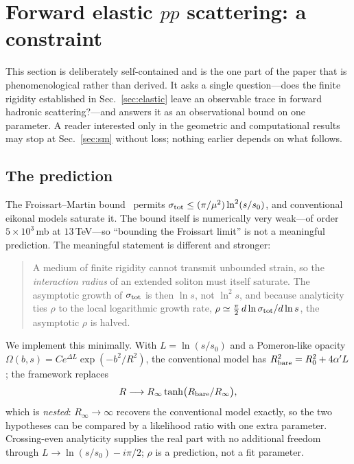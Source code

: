 \documentclass[aps,prd,preprint,nofootinbib,longbibliography]{revtex4-2}
\begin{document}
\section{Forward elastic $pp$ scattering: a constraint}
\label{sec:scattering}

This section is deliberately self-contained and is the one part of the paper that
is phenomenological rather than derived. It asks a single question---does the
finite rigidity established in Sec.~\ref{sec:elastic} leave an observable trace
in forward hadronic scattering?---and answers it as an observational bound on one
parameter. A reader interested only in the geometric and computational results
may stop at Sec.~\ref{sec:sm} without loss; nothing earlier depends on what
follows.

\subsection{The prediction}

The Froissart--Martin bound~\cite{froissart1961,martin1963} permits
$\sigma_{\rm tot}\le(\pi/\mu^2)\ln^2(s/s_0)$, and conventional eikonal models
saturate it. The bound itself is numerically very weak---of order
$5\times10^3\,$mb at $13\,$TeV---so ``bounding the Froissart limit'' is not a
meaningful prediction. The meaningful statement is different and stronger:

\begin{quote}
A medium of finite rigidity cannot transmit unbounded strain, so the
\emph{interaction radius} of an extended soliton must itself saturate. The
asymptotic growth of $\sigma_{\rm tot}$ is then $\ln s$, not $\ln^2 s$, and
because analyticity ties $\rho$ to the local logarithmic growth rate,
$\rho\simeq\tfrac{\pi}{2}\,d\ln\sigma_{\rm tot}/d\ln s$, the asymptotic $\rho$ is
halved.
\end{quote}

We implement this minimally. With $L=\ln(s/s_0)$ and a Pomeron-like opacity
$\Omega(b,s)=Ce^{\Delta L}\exp(-b^2/R^2)$, the conventional model has
$R^2_{\rm bare}=R_0^2+4\alpha' L$; the framework replaces
\begin{equation}
R\longrightarrow R_\infty\tanh\!\big(R_{\rm bare}/R_\infty\big),
\end{equation}
which is \emph{nested}: $R_\infty\to\infty$ recovers the conventional model
exactly, so the two hypotheses can be compared by a likelihood ratio with one
extra parameter. Crossing-even analyticity supplies the real part with no
additional freedom through $L\to\ln(s/s_0)-i\pi/2$; $\rho$ is a prediction, not a
fit parameter.
\end{document}
